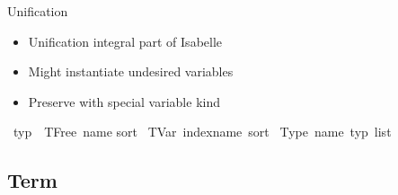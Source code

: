 \begin{frame}{Unification}
\begin{center}
\end{center}
\begin{itemize}
    \item Unification integral part of Isabelle
    \item Might instantiate undesired variables
    \item Preserve with special variable kind
\end{itemize}
\end{frame}

\begin{frame}
    \begin{isabelle}
        \ typ\ {\isacharequal}\ TFree\ name sort\isanewline
        \isaindent{\ \ }{\isacharbar}\ TVar\ indexname\ sort\isanewline
        \isaindent{\ \ }{\isacharbar}\ Type\ name\ {\isacharparenleft}typ\ list{\isacharparenright}
    \end{isabelle}
\end{frame}

\subsection{Term}


